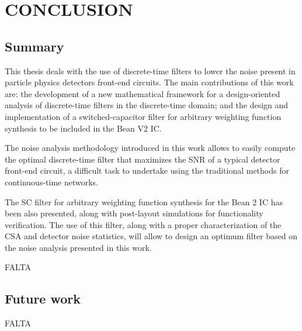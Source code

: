 \chapter{CONCLUSION}
\label{chapter:conclusion}
\section{Summary}

This thesis deals with the use of discrete-time filters to lower the noise present in particle physics detectors front-end circuits. The main contributions of this work are: the development of a new mathematical framework for a design-oriented analysis of discrete-time filters in the discrete-time domain; and the design and implementation of a switched-capacitor filter for arbitrary weighting function synthesis to be included in the Bean V2 IC.

The noise analysis methodology introduced in this work allows to easily compute the optimal discrete-time filter that maximizes the SNR of a typical detector front-end circuit, a difficult task to undertake using the traditional methods for continuous-time networks.

The SC filter for arbitrary weighting function synthesis for the Bean 2 IC has been also presented, along with post-layout simulations for functionality verification. The use of this filter,  along with a proper characterization of the CSA and detector noise statistics, will allow to design an optimum filter based on the noise analysis presented in this work.

FALTA		

\section{Future work}


FALTA